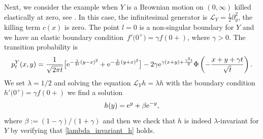 \documentclass[10pt,a4paper]{amsart}
\numberwithin{equation}{section}
\theoremstyle{definition}
\def\L{{\mathcal L}}
\begin{document}
Next, we consider the example when $Y$ is a Brownian motion on $(0,\infty)$ killed elastically at zero,
see \cite[p.~125]{Borodin2002}. In this case, the infinitesimal generator is $\L_Y=\frac{1}{2}\partial_y^2$, the killing term $c(x)$ is zero. The point $l=0$ is a non-singular boundary for $Y$ and we have an elastic boundary condition~${f'\bigl(0^+\bigr)=\gamma f(0+)}$, where $\gamma>0$. The transition probability is
\[
p^Y_t(x,y)=\frac{1}{\sqrt{2\pi t}} \big[ {\rm e}^{-\frac{1}{2t}(y-x)^2}+
 {\rm e}^{-\frac{1}{2t}(y+x)^2} \big]- 2\gamma {\rm e}^{ \gamma(x+y)+\frac{\gamma^2t}{2} } \Phi\left( -\frac{x+y+\gamma t}{\sqrt{t}} \right).
\]
We set $\lambda=1/2$ and solving the equation $\L_Y h=\lambda h$ with the boundary condition $h'\bigl(0^+\bigr)=\gamma f(0+)$ we find a solution
\begin{equation}\label{h3}
h(y)={\rm e}^{y} + \beta {\rm e}^{-y},
\end{equation}
where $\beta:=(1-\gamma)/(1+\gamma)$ and then we check that $h$ is indeed $\lambda$-invariant for $Y$ by verifying that \eqref{lambda_invariant_h} holds.
\end{document}
